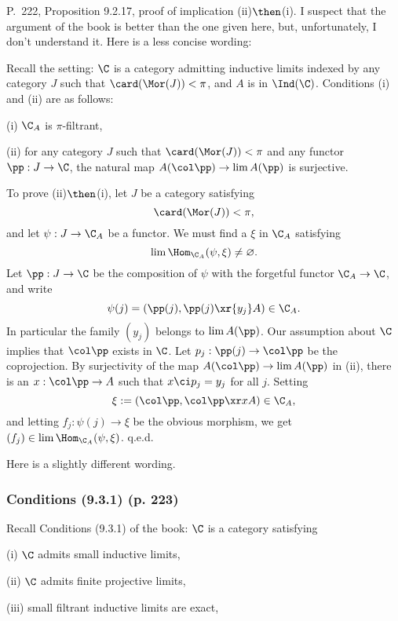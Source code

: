 \documentclass[12pt]{article}
\theoremstyle{remark}
\theoremstyle{definition}
\begin{document}
%

\begin{s} 
P.~222, Proposition 9.2.17, proof of implication (ii)$\then$(i). I suspect that the argument of the book is better than the one given here, but, unfortunately, I don't understand it. Here is a less concise wording:

Recall the setting: $\C$ is a category admitting inductive limits indexed by any category $J$ such that $\card(\Mor(J))<\pi$, and $A$ is in $\Ind(\C)$. Conditions (i) and (ii) are as follows: 

\nn(i) $\C_A$ is $\pi$-filtrant, 

\nn(ii) for any category $J$ such that $\card(\Mor(J))<\pi$ and any functor $\pp:J\to\C$, the natural map $A(\col\pp)\to\lim A(\pp)$ is surjective. 

To prove (ii)$\then$(i), let $J$ be a category satisfying 
$$
\card(\Mor(J))<\pi,
$$ 
and let $\psi:J\to\C_A$ be a functor. We must find a $\xi$ in $\C_A$ satisfying 
$$
\lim\Hom_{\C_A}(\psi,\xi)\neq\varnothing.
$$ 
Let $\pp:J\to\C$ be the composition of $\psi$ with the forgetful functor $\C_A\to\C$, and write 
$$
\psi(j)=\left(\pp(j),\pp(j)\xr{y_j}A\right)\in\C_A.
$$ 
In particular the family $(y_j)$ belongs to $\lim A(\pp)$. Our assumption about $\C$ implies that $\col\pp$ exists in $\C$. Let $p_j:\pp(j)\to\col\pp$ be the coprojection. By surjectivity of the map $A(\col\pp)\to\lim A(\pp)$ in (ii), there is an $x:\col\pp\to A$ such that $x\ci p_j=y_j$ for all $j$. Setting 
$$
\xi:=\left(\col\pp,\col\pp\xr x A\right)\in\C_A,
$$ 
and letting $f_j:\psi(j)\to\xi$ be the obvious morphism, we get $(f_j)\in\lim\Hom_{\C_A}(\psi,\xi)$. q.e.d. 
\end{s}



Here is a slightly different wording. 

\subsubsection{Conditions (9.3.1) (p. 223)}

Recall Conditions (9.3.1) of the book: $\C$ is a category satisfying  

(i) $\C$ admits small inductive limits,

(ii) $\C$ admits finite projective limits,

(iii) small filtrant inductive limits are exact, 
\end{document}
